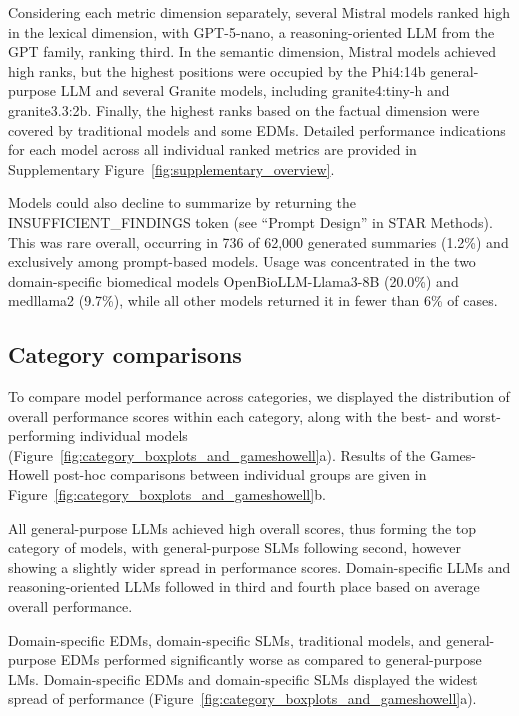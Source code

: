 Considering each metric dimension separately, several Mistral models ranked high in the lexical dimension, with GPT-5-nano, a reasoning-oriented \ac{LLM} from the \ac{GPT} family, ranking third. In the semantic dimension, Mistral models achieved high ranks, but the highest positions were occupied by the Phi4:14b general-purpose \ac{LLM} and several Granite models, including granite4:tiny-h and granite3.3:2b. Finally, the highest ranks based on the factual dimension were covered by traditional models and some \acp{EDM}. Detailed performance indications for each model across all individual ranked metrics are provided in Supplementary Figure~\ref{fig:supplementary_overview}.

Models could also decline to summarize by returning the INSUFFICIENT\_FINDINGS token (see ``Prompt Design'' in STAR Methods). This was rare overall, occurring in 736 of 62,000 generated summaries (1.2\%) and exclusively among prompt-based models. Usage was concentrated in the two domain-specific biomedical models OpenBioLLM-Llama3-8B (20.0\%) and medllama2 (9.7\%), while all other models returned it in fewer than 6\% of cases.

\subsection{Category comparisons}

To compare model performance across categories, we displayed the distribution of overall performance scores within each category, along with the best- and worst-performing individual models (Figure~\ref{fig:category_boxplots_and_gameshowell}a). Results of the Games-Howell post-hoc comparisons between individual groups are given in Figure~\ref{fig:category_boxplots_and_gameshowell}b.

All general-purpose \acp{LLM} achieved high overall scores, thus forming the top category of models, with general-purpose \acp{SLM} following second, however showing a slightly wider spread in performance scores. Domain-specific \acp{LLM} and reasoning-oriented \acp{LLM} followed in third and fourth place based on average overall performance.

Domain-specific \acp{EDM}, domain-specific \acp{SLM}, traditional models, and general-purpose \acp{EDM} performed significantly worse as compared to general-purpose \acp{LM}. Domain-specific \acp{EDM} and domain-specific \acp{SLM} displayed the widest spread of performance (Figure~\ref{fig:category_boxplots_and_gameshowell}a).

